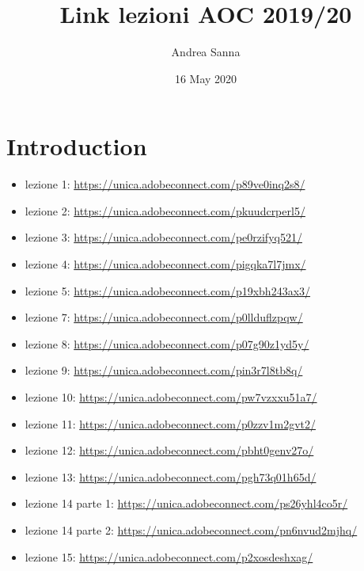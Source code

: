 \documentclass{article}
\title{Link lezioni AOC 2019/20}
\author{Andrea Sanna}
\date{16 May 2020}
\begin{document}
\maketitle

\section{Introduction}
\begin{itemize}
\item lezione 1: \url{https://unica.adobeconnect.com/p89ve0inq2s8/}\\
\item lezione 2: \url{https://unica.adobeconnect.com/pkuudcrperl5/}\\
\item lezione 3: \url{https://unica.adobeconnect.com/pe0rzifyq521/}\\
\item lezione 4: \url{https://unica.adobeconnect.com/pigqka7l7jmx/}\\
\item lezione 5: \url{https://unica.adobeconnect.com/p19xbh243ax3/}\\
\item lezione 7: \url{https://unica.adobeconnect.com/p0llduflzpqw/}\\
\item lezione 8: \url{https://unica.adobeconnect.com/p07g90z1yd5y/}\\
\item lezione 9: \url{https://unica.adobeconnect.com/pin3r7l8tb8q/}\\
\item lezione 10: \url{https://unica.adobeconnect.com/pw7vzxxu51a7/}\\
\item lezione 11: \url{https://unica.adobeconnect.com/p0zzv1m2gvt2/}\\
\item lezione 12: \url{https://unica.adobeconnect.com/pbht0genv27o/}\\
\item lezione 13: \url{https://unica.adobeconnect.com/pgh73q01h65d/}\\
\item lezione 14 parte 1: \url{https://unica.adobeconnect.com/ps26yhl4co5r/}\\
\item lezione 14 parte 2: \url{https://unica.adobeconnect.com/pn6nvud2mjhq/}\\
\item lezione 15: \url{https://unica.adobeconnect.com/p2xosdeshxag/}\\

\end{itemize}
\end{document}
